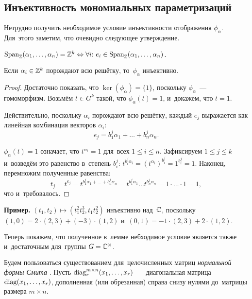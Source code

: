 \documentclass[a4paper,oneside]{article}
\begin{document}
\subsection{Инъективность мономиальных параметризаций}
Нетрудно получить необходимое условие инъективности отображения $\phi_\alpha$.
Для~этого заметим, что очевидно следующее утверждение.

\begin{statement*}
  $\mathrm{Span}_{\mathbb{Z}}(\alpha_1, \ldots, \alpha_n) = \mathbb{Z}^k \Leftrightarrow \forall i{:}\ e_i \in \mathrm{Span}_{\mathbb{Z}}(\alpha_1, \ldots, \alpha_n)$.
\end{statement*}

\begin{lemma}
  Если $\alpha_i \in \mathbb{Z}^k$ порождают всю решётку, то~$\phi_\alpha$ инъективно.
\end{lemma}

\begin{proof}
  Достаточно показать, что $\ker(\phi_\alpha) = \{1\}$, поскольку $\phi_\alpha$~— гомоморфизм.
  Возьмём $t \in G^k$ такой, что $\phi_\alpha(t) = 1$, и~докажем, что $t = 1$.

  Действительно, поскольку $\alpha_i$ порождают всю решётку, каждый $e_j$ выражается как линейная комбинация векторов $\alpha_i$:
  \[
    e_j = b^j_1 \alpha_1 + \ldots + b^j_n \alpha_n.
  \]

  $\phi_\alpha(t) = 1$ означает, что $t^{\alpha_i} = 1$ для~всех $1 \leq i \leq n$.
  Зафиксируем $1 \leq j \leq k$ и~возведём это равенство в~степень $b^j_i$: $t^{b^j_i \alpha_i} = (t^{\alpha_i})^{b^j_i} = 1^{b^j_i} = 1$.
  Наконец, перемножим полученные равенства:
  \[
    t_j = t^{e_j} = t^{b^j_1 \alpha_1 + \ldots + b^j_n \alpha_n} = t^{b^j_1 \alpha_1} \ldots t^{b^j_n \alpha_n} = 1 \cdot \ldots \cdot 1 = 1,
  \]
  что и~требовалось.
\end{proof}

\noindent\textbf{Пример.} $(t_1, t_2) \mapsto (t_1^2 t_2^3, t_1 t_2^2)$ инъективно над~$\mathbb{C}$,
поскольку $(1, 0) = 2 \cdot (2, 3) + (-3) \cdot (1, 2)$ и~$(0, 1) = -1 \cdot (2, 3) + 2 \cdot (1, 2)$.
\medskip

Теперь покажем, что полученное в~лемме небходимое условие является также и~достаточным для~группы $G = \mathbb{C}^\times$.

Будем пользоваться существованием для~целочисленных матриц \textit{нормальной формы Смита} \cite{Smth60}.
Пусть $\mathrm{diag}^{m \times n}_r(x_1, \ldots, x_r)$~— диагональная матрица $\mathrm{diag}(x_1, \ldots, x_r)$,
дополненная (или обрезанная) справа снизу нулями до~матрицы размера $m \times n$.
\end{document}
